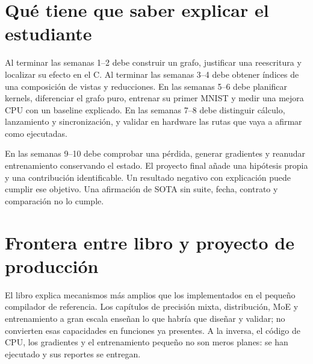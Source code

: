 \documentclass[12pt,a4paper,oneside]{report}
\begin{document}
\section{Qué tiene que saber explicar el estudiante}
Al terminar las semanas 1--2 debe construir un grafo, justificar una reescritura y localizar su efecto en el C. Al terminar las semanas 3--4 debe obtener índices de una composición de vistas y reducciones. En las semanas 5--6 debe planificar kernels, diferenciar el grafo puro, entrenar su primer MNIST y medir una mejora CPU con un baseline explicado. En las semanas 7--8 debe distinguir cálculo, lanzamiento y sincronización, y validar en hardware las rutas que vaya a afirmar como ejecutadas.

En las semanas 9--10 debe comprobar una pérdida, generar gradientes y reanudar entrenamiento conservando el estado. El proyecto final añade una hipótesis propia y una contribución identificable. Un resultado negativo con explicación puede cumplir ese objetivo. Una afirmación de SOTA sin suite, fecha, contrato y comparación no lo cumple.

\section{Frontera entre libro y proyecto de producción}
El libro explica mecanismos más amplios que los implementados en el pequeño compilador de referencia. Los capítulos de precisión mixta, distribución, MoE y entrenamiento a gran escala enseñan lo que habría que diseñar y validar; no convierten esas capacidades en funciones ya presentes. A la inversa, el código de CPU, los gradientes y el entrenamiento pequeño no son meros planes: se han ejecutado y sus reportes se entregan.
\end{document}
